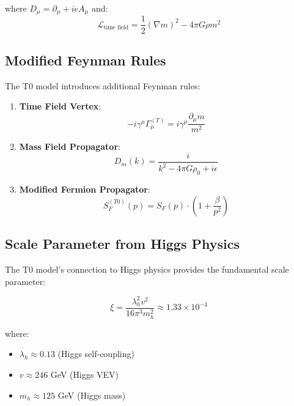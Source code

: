 \documentclass[12pt,a4paper]{article}
\begin{document}
	where $D_{\mu} = \partial_{\mu} + ie A_{\mu}$ and:
	\begin{equation}
		\mathcal{L}_{\text{time field}} = \frac{1}{2}(\nabla m)^2 - 4\pi G \rho m^2
		\label{eq:time_field_lagrangian}
	\end{equation}
	
	\subsection{Modified Feynman Rules}
	\label{subsec:modified_feynman_rules}
	
	The T0 model introduces additional Feynman rules:
	
	\begin{enumerate}
		\item \textbf{Time Field Vertex}: 
		\begin{equation}
			-i\gamma^{\mu}\Gamma_{\mu}^{(T)} = i\gamma^{\mu}\frac{\partial_{\mu} m}{m^2}
			\label{eq:time_field_vertex}
		\end{equation}
		
		\item \textbf{Mass Field Propagator}:
		\begin{equation}
			D_m(k) = \frac{i}{k^2 - 4\pi G \rho_0 + i\epsilon}
			\label{eq:mass_propagator}
		\end{equation}
		
		\item \textbf{Modified Fermion Propagator}:
		\begin{equation}
			S_F^{(T0)}(p) = S_F(p) \cdot \left(1 + \frac{\beta}{p^2}\right)
			\label{eq:modified_fermion_propagator}
		\end{equation}
	\end{enumerate}
	
	\subsection{Scale Parameter from Higgs Physics}
	\label{subsec:scale_parameter_higgs}
	
	The T0 model's connection to Higgs physics provides the fundamental scale parameter:
	
	\begin{equation}
		\xi = \frac{\lambda_h^2 v^2}{16\pi^3 m_h^2} \approx 1.33 \times 10^{-4}
		\label{eq:xi_higgs_derived}
	\end{equation}
	
	where:
	\begin{itemize}
		\item $\lambda_h \approx 0.13$ (Higgs self-coupling)
		\item $v \approx 246$ GeV (Higgs VEV)
		\item $m_h \approx 125$ GeV (Higgs mass)
	\end{itemize}
	
\end{document}
